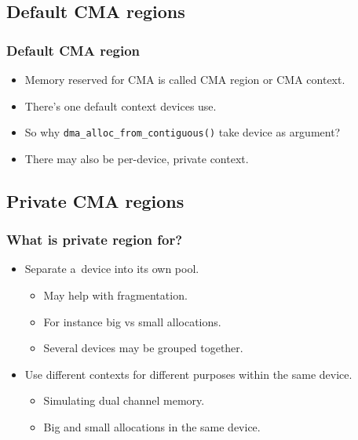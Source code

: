 
\subsection{Default CMA regions}

\begin{frame}
  \frametitle{Default CMA region}

  \begin{itemize}
  \item Memory reserved for CMA is called CMA region or CMA context.
  \item There's one default context devices use.
  \item So why \lstinline|dma_alloc_from_contiguous()| take device as
    argument?
  \item There may also be per-device, private context.
  \end{itemize}
\end{frame}

\subsection{Private CMA regions}

\begin{frame}
  \frametitle{What is private region for?}

  \begin{itemize}
  \item Separate a~device into its own pool.
    \begin{itemize}
    \item May help with fragmentation.
    \item For instance big vs small allocations.
    \item Several devices may be grouped together.
    \end{itemize}
  \item Use different contexts for different purposes within the same
    device.
    \begin{itemize}
    \item Simulating dual channel memory.
    \item Big and small allocations in the same device.
    \end{itemize}
  \end{itemize}
\end{frame}
